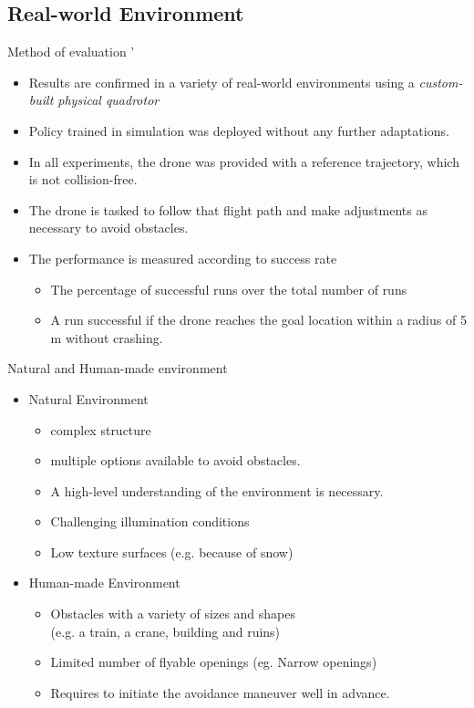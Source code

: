 \documentclass{beamer}
\begin{document}
\subsection{Real-world Environment}
\begin{frame}{Method of evaluation}
	'\begin{itemize}
		\item Results are confirmed in a variety of real-world environments using a \textit{custom-built physical quadrotor}
		\item Policy trained in simulation was deployed without any further adaptations.
		\item In all experiments, the drone was provided with a reference trajectory, which is not collision-free.
		\item The drone is tasked to follow that flight path and make adjustments as necessary to avoid obstacles.
		\item The performance is measured according to success rate
		\begin{itemize}
			\item The percentage of successful runs over the total number of runs
			\item A run successful if the drone reaches the goal location within a radius of 5 m without crashing.
		\end{itemize} 
	\end{itemize}
\end{frame}

\begin{frame}{Natural and Human-made environment}
	\begin{itemize}
		\item Natural Environment
		\begin{itemize}
			\item complex structure
			\item multiple options available to avoid obstacles. 
			\item A high-level understanding of the environment is necessary.
			\item Challenging illumination conditions
			\item Low texture surfaces (e.g. because of snow)
		\end{itemize}
	
		\item Human-made Environment
		\begin{itemize}
			\item Obstacles with a variety of sizes and shapes \\
			(e.g. a train, a crane, building and ruins)
			\item Limited number of flyable openings (eg. Narrow openings)
			\item Requires to initiate the avoidance maneuver well in advance.
		\end{itemize}
	\end{itemize}	
\end{frame}
\end{document}
